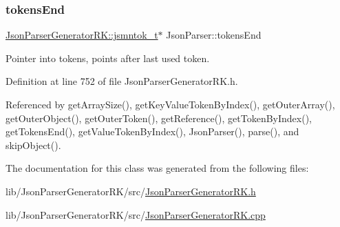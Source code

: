 \mbox{\label{class_json_parser_a6b8c13ce885f8bc7470248d0dc56f157}} 
\subsubsection{\texorpdfstring{tokens\+End}{tokensEnd}}
{\footnotesize\ttfamily \hyperlink{struct_json_parser_generator_r_k_1_1jsmntok__t}{Json\+Parser\+Generator\+R\+K\+::jsmntok\+\_\+t}$\ast$ Json\+Parser\+::tokens\+End\hspace{0.3cm}{\ttfamily [protected]}}



Pointer into tokens, points after last used token. 



Definition at line 752 of file Json\+Parser\+Generator\+R\+K.\+h.



Referenced by get\+Array\+Size(), get\+Key\+Value\+Token\+By\+Index(), get\+Outer\+Array(), get\+Outer\+Object(), get\+Outer\+Token(), get\+Reference(), get\+Token\+By\+Index(), get\+Tokens\+End(), get\+Value\+Token\+By\+Index(), Json\+Parser(), parse(), and skip\+Object().



The documentation for this class was generated from the following files\+:\begin{DoxyCompactItemize}
\item 
lib/\+Json\+Parser\+Generator\+R\+K/src/\hyperlink{_json_parser_generator_r_k_8h}{Json\+Parser\+Generator\+R\+K.\+h}\item 
lib/\+Json\+Parser\+Generator\+R\+K/src/\hyperlink{_json_parser_generator_r_k_8cpp}{Json\+Parser\+Generator\+R\+K.\+cpp}\end{DoxyCompactItemize}

